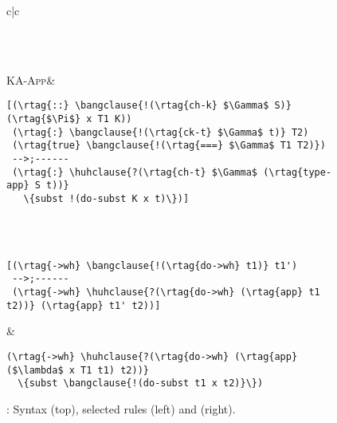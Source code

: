 \begin{figure}
\begin{tabular}{c|c}
\begin{minipage}{2.5in}
{\begin{Verbatim}[baselinestretch=.8,commandchars=\\\{\},codes={\catcode`$=3\catcode`^=7}]
\end{Verbatim}
}\end{minipage} \\
\\
  {{\small\textsc{KA-App}}\quad{}}\quad&
\begin{minipage}{2.5in}
{\footnotesize
\begin{Verbatim}[baselinestretch=.8,commandchars=\\\{\},codes={\catcode`$=3\catcode`^=7}]
[(\rtag{::} \bangclause{!(\rtag{ch-k} $\Gamma$ S)} (\rtag{$\Pi$} x T1 K))
 (\rtag{:} \bangclause{!(\rtag{ck-t} $\Gamma$ t)} T2)
 (\rtag{true} \bangclause{!(\rtag{===} $\Gamma$ T1 T2)})
 -->;------
 (\rtag{:} \huhclause{?(\rtag{ch-t} $\Gamma$ (\rtag{type-app} S t))}
   \{subst !(do-subst K x t)\})]
\end{Verbatim}
}\end{minipage} \\
\\
\begin{minipage}{2.75in}
{\small
\begin{Verbatim}[baselinestretch=.8,commandchars=\\\{\},codes={\catcode`$=3\catcode`^=7}]
[(\rtag{->wh} \bangclause{!(\rtag{do->wh} t1)} t1')
 -->;------
 (\rtag{->wh} \huhclause{?(\rtag{do->wh} (\rtag{app} t1 t2))} (\rtag{app} t1' t2))]
\end{Verbatim}
}
\end{minipage}
&
\quad
\quad
\begin{minipage}{2.75in}
{\small
\begin{Verbatim}[baselinestretch=.8,commandchars=\\\{\},codes={\catcode`$=3\catcode`^=7}]
(\rtag{->wh} \huhclause{?(\rtag{do->wh} (\rtag{app} ($\lambda$ x T1 t1) t2))}
  \{subst \bangclause{!(do-subst t1 x t2)}\})
\end{Verbatim}
}\end{minipage} 
\end{tabular}

\caption{\lf{}: Syntax (top), selected rules (left) and \slog{} (right).}
\label{fig:lf}
\end{figure}

